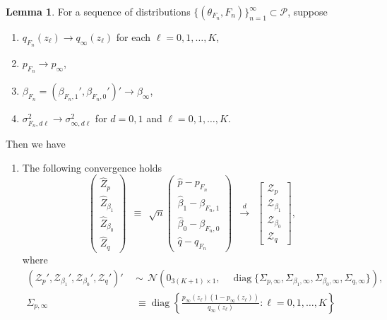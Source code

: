 \documentclass[11pt]{article}
\theoremstyle{definition}
\newtheorem{lemma}{Lemma}[section]
\DeclareMathOperator*{\diag}{diag}
\newcommand{\0}{\ensuremath{\mathbf{0}}}
\newcommand{\normal}{\ensuremath{\mathcal{N}}}
\begin{document}
\begin{bibunit}
%
\begin{lemma}
\label{lem:convergence_p_beta}
	For a sequence of distributions $\{(\theta_{F_n}, F_n)\}_{n=1}^\infty \subset \mathcal{P}$, suppose 
	\begin{enumerate}
		\item $q_{F_n}(z_\ell) \to q_{\infty}(z_\ell)$ for each $\ell = 0,1,\ldots,K$,
		\item $p_{F_n} \to p_\infty$,
		\item $\beta_{F_n} = (\beta_{F_n,1}', \beta_{F_n,0}')' \to \beta_{\infty}$,
		\item $\sigma^2_{F_n,d\ell} \to \sigma_{\infty,d\ell}^2$ for $d = 0,1$ and $\ell = 0,1,\ldots,K$.
	\end{enumerate}
	Then we have 
	\begin{enumerate}
	\item[(a)] The following convergence holds
	\begin{equation}
	\label{eq:clt_p_beta}
            \begin{pmatrix}
            \hat{Z}_p \\
            \hat{Z}_{\beta_1} \\
            \hat{Z}_{\beta_0} \\
            \hat{Z}_{q}
            \end{pmatrix}
            ~~\equiv~~
		\sqrt{n}
		\begin{pmatrix}
			\hat{p} - p_{F_n} \\
			\hat{\beta}_1 - \beta_{F_n, 1} \\
			\hat{\beta}_0 - \beta_{F_n, 0} \\
			\hat{q} - q_{F_n}
		\end{pmatrix}
		~~\xrightarrow{d}~~
		\begin{bmatrix}
			\mathcal{Z}_p \\
			\mathcal{Z}_{\beta_1} \\
			\mathcal{Z}_{\beta_0} \\
			\mathcal{Z}_q
		\end{bmatrix},
	\end{equation}
	where 
	\begin{align*}
            (\mathcal{Z}_p', \mathcal{Z}_{\beta_1}', \mathcal{Z}_{\beta_0}', \mathcal{Z}_q')' 
            ~~&\sim~~
		\normal\left(0_{3(K+1)\times 1},  \quad 
		\diag\{\Sigma_{p,\infty}, \Sigma_{\beta_1,\infty}, \Sigma_{\beta_0,\infty},\Sigma_{q,\infty}\}\right), \\
		\Sigma_{p,\infty} 
            &\equiv \diag\left\{\frac{p_\infty(z_\ell) (1-p_\infty(z_\ell))}{q_\infty(z_\ell)}: \ell = 0,1,\ldots,K\right\} \\

\end{align*}
\end{enumerate}
\end{lemma}
\end{bibunit}
\end{document}
